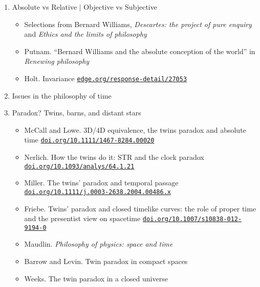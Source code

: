 \documentclass[11pt]{article}
\newcommand\rurl[1]{%
  \href{http://#1}{\nolinkurl{#1}}%
}
\begin{document}
\begin{enumerate}
\item Absolute vs Relative $|$ Objective vs Subjective
  \begin{itemize}
  \item Selections from Bernard Williams, \emph{Descartes: the project
      of pure enquiry} and \emph{Ethics and the limits of philosophy}
  \item Putnam. ``Bernard Williams and the absolute conception of the
    world'' in \emph{Renewing philosophy}
  \item Holt. Invariance \rurl{edge.org/response-detail/27053}
  \end{itemize}

\item Issues in the philosophy of time  

\item Paradox? Twins, barns, and distant stars %
  \begin{itemize}
  \item McCall and Lowe. 3D/4D equivalence, the twins paradox and
    absolute time \rurl{doi.org/10.1111/1467-8284.00020}
  \item Nerlich. How the twins do it: STR and the clock paradox
    \rurl{doi.org/10.1093/analys/64.1.21}
  \item Miller. The twins’ paradox and temporal passage
    \rurl{doi.org/10.1111/j.0003-2638.2004.00486.x}
  \item Friebe. Twins' paradox and closed timelike curves: the role
    of proper time and the presentist view on spacetime
    \rurl{doi.org/10.1007/s10838-012-9194-0}
  \item Maudlin. \textit{Philosophy of physics: space and time}
  \item Barrow and Levin. Twin paradox in compact spaces
  \item Weeks. The twin paradox in a closed universe
  \end{itemize}





\end{enumerate}
\end{document}

